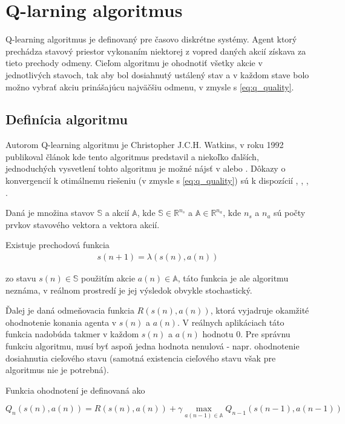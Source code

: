 \chapter{Q-larning algoritmus}

Q-learning algoritmus je definovaný pre časovo diskrétne systémy.
Agent ktorý prechádza stavový priestor vykonaním niektorej z vopred daných
akcií získava za tieto prechody odmeny. Cieľom algoritmu je ohodnotiť všetky akcie
v jednotlivých stavoch, tak aby bol dosiahnutý ustálený stav a v každom stave
bolo možno vybrať akciu prinášajúcu najväčšiu odmenu, v zmysle
s \ref{eq:q_quality}.


\section{Definícia algoritmu}

Autorom Q-learning algoritmu je Christopher J.C.H. Watkins, v roku 1992 publikoval
článok kde tento algoritmus predstavil \cite{bib:q_learning_watkins} a niekoľko ďalších,
jednoduchých vysvetlení tohto algoritmu je možné nájsť v \cite{bib:q_tutorial_01} alebo
\cite{bib:q_tutorial_02}. Dôkazy o konvergencií k otimálnemu riešeniu (v zmysle
s \ref{eq:q_quality}) sú k dispozícií \cite{bib:q_proof_01}, \cite{bib:q_proof_02},
\cite{bib:q_proof_03}, \cite{bib:q_proof_04}.

Daná je množina stavov $\mathbb{S}$ a akcií $\mathbb{A}$, kde
 $\mathbb{S} \in \mathbb{R}^{n_s}$ a $\mathbb{A} \in \mathbb{R}^{n_a}$, kde
$n_s$ a  $n_a$ sú počty prvkov stavového vektora a vektora akcií.

Existuje prechodová funkcia
\begin{align}
        s(n+1) = \lambda(s(n), a(n))
\end{align}

zo stavu $s(n) \in \mathbb{S}$ použitím akcie $a(n) \in \mathbb{A}$, táto funkcia je ale algoritmu neznáma,
v reálnom prostredí je jej výsledok obvykle stochastický.

Ďalej je daná odmeňovacia funkcia $R(s(n),a(n))$, ktorá vyjadruje okamžité ohodnotenie konania
agenta v $s(n)$ a $a(n)$. V reálnych aplikáciach táto funkcia nadobúda takmer v každom
$s(n)$ a $a(n)$ hodnotu $0$. Pre správnu funkciu algoritmu, musí byť aspoň jedna hodnota
nenulová - napr. ohodnotenie dosiahnutia cieľového stavu (samotná existencia cieľového
stavu však pre algoritmus nie je potrebná).

Funkcia ohodnotení je definovaná ako

\begin{equation}
Q_{n}(s(n),a(n)) = R(s(n),a(n)) + \gamma \max_{a(n-1) \in \mathbb{A}} Q_{n-1}(s(n-1), a(n-1))
\label{eq:q_learning}
\end{equation}

